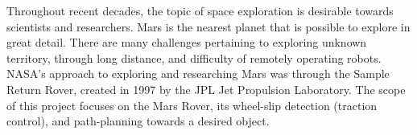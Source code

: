 Throughout recent decades, the topic of space exploration is desirable towards scientists and researchers. Mars is the nearest planet that is possible to explore in great detail. There are many challenges pertaining to exploring unknown territory, through long distance, and difficulty of remotely operating robots. NASA’s approach to exploring and researching Mars was through the Sample Return Rover, created in 1997 by the JPL Jet Propulsion Laboratory. The scope of this project focuses on the Mars Rover, its wheel-slip detection (traction control), and path-planning towards a desired object. 